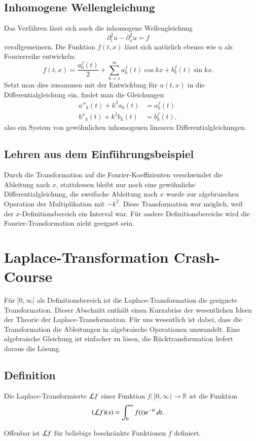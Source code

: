 \subsection{Inhomogene Wellengleichung}
Das Verfähren lässt sich auch die inhomogene Wellengleichung
\[
\partial_t^2u-\partial_x^2u=f
\]
verallgemeinern. Die Funktion $f(t,x)$ lässt sich natürlich ebenso wie
$u$ als Fourierreihe entwickeln:
\[
f(t,x)=\frac{a_0^f(t)}2+\sum_{k=1}^\infty a_k^f(t)\cos kx+b_k^f(t)\sin kx.
\]
Setzt man dies zusammen mit der Entwicklung für $u(t,x)$ in die
Differentialgleichung ein, findet man die Gleichungen
\begin{align*}
a''_k(t)+k^2a_k(t)&=a_k^f(t)\\
b''_k(t)+k^2b_k(t)&=b_k^f(t),
\end{align*}
also ein System von gewöhnlichen inhomogenen linearen Differentialgleichungen.

\subsection{Lehren aus dem Einführungsbeispiel}
Durch die Transformation auf die Fourier-Koeffizienten verschwindet die
Ableitung nach $x$,  stattdessen bleibt nur noch eine gewöhnliche
Differentialgleichung, die zweifache Ableitung nach $x$ wurde zur
algebraischen Operation der Multiplikation mit $-k^2$. Diese Transformation
war möglich, weil der $x$-Definitionsbereich ein Interval war.
Für andere Definitionsbereiche wird die Fourier-Transformation nicht
geeignet sein.

\section{Laplace-Transformation Crash-Course}
Für $[0,\infty[$ als Definitionsbereich ist die Laplace-Transformation
die geeignete Transformation. Dieser Abschnitt enthält einen Kurzabriss
der wesentlichen Ideen der Theorie der Laplace-Transformation.
Für uns wesentlich ist dabei, dass die Transformation die Ableitungen
in algebraische Operationen umwandelt. Eine algebraische Gleichung ist
einfacher zu lösen, die Rücktransformation liefert daraus die Lösung.

\subsection{Definition}
\begin{definition}
Die Laplace-Transformierte ${\cal L}f$ einer Funktion
$f\colon[0,\infty)\to\mathbb R$ ist die Funktion
\[
({\cal L}f)(s)=\int_0^\infty f(t)e^{-st}\,dt.
\]
\end{definition}
Offenbar ist ${\cal L}f$ für beliebige beschränkte Funktionen $f$ definiert.

